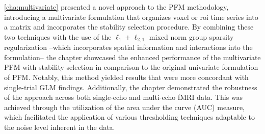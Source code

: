 \cref{cha:multivariate} presented a novel approach to the PFM methodology,
introducing a multivariate formulation that organizes voxel or \acrshort*{roi}
time series into a matrix and incorporates the stability selection procedure. By
combining these two techniques with the use of the $\ell_1 + \ell_{2,1}$ mixed
norm group sparsity regularization --which incorporates spatial information and
interactions into the formulation-- the chapter showcased the enhanced
performance of the multivariate PFM with stability selection in comparison to
the original univariate formulation of PFM. Notably, this method yielded results
that were more concordant with single-trial GLM findings. Additionally, the
chapter demonstrated the robustness of the approach across both single-echo and
multi-echo fMRI data. This was achieved through the utilization of the area
under the curve (AUC) measure, which facilitated the application of various
thresholding techniques adaptable to the noise level inherent in the data.

